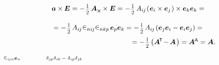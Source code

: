\begin{otherlanguage}{russian}
\nopagebreak\vspace{-0.1em}\[\begin{array}{c}
\bm{a} \times\hspace{-0.1ex} \UnitDyad = - \hspace{.2ex} \smalldisplaystyleonehalf \hspace{.4ex} \bm{A}_{\Xcompanion} \times \UnitDyad = - \hspace{.2ex} \smalldisplaystyleonehalf \, A_{i\hspace{-0.1ex}j} \hspace{-0.2ex}
\left( \hspace{.08ex} \tikzmark{beginFirstCrossProduct} {\bm{e}_i \times \bm{e}_j} \tikzmark{endFirstCrossProduct} \hspace{.16ex} \right)
\times \bm{e}_k \bm{e}_k = \\[1.5em]
%
= - \hspace{.2ex} \smalldisplaystyleonehalf \hspace{.32ex} A_{i\hspace{-0.1ex}j} \hspace{.12ex}
\tikzmark{beginTwoLeviCivitas} \levicivita_{ni\hspace{-0.1ex}j} \levicivita_{nkp} \tikzmark{endTwoLeviCivitas}
\hspace{.32ex} \bm{e}_p \bm{e}_k = - \hspace{.2ex} \smalldisplaystyleonehalf \hspace{.32ex} A_{i\hspace{-0.1ex}j} \hspace{-0.1ex} \left( \bm{e}_j \bm{e}_i - \bm{e}_i \bm{e}_j \right) = \\[.8em]
%
\hspace{13.2em}= - \hspace{.2ex} \smalldisplaystyleonehalf \left({ \bm{A}^{\hspace{-0.1em}\T} \hspace{-0.25ex} - \hspace{-0.2ex} \bm{A} \hspace{.2ex}}\right) = \bm{A}^{\mathsf{\hspace{-0.1ex}A}} = \bm{A}.
\end{array}\]
%
{${\scriptstyle \levicivita_{i\hspace{-0.1ex}jn} \bm{e}_n}$}
%
{${\scriptstyle \hspace{3.2em}\delta_{j\hspace{-0.1ex}p} \delta_{ik} \,-\; \delta_{ip} \delta_{j\hspace{-0.1ex}k}}$}


\end{otherlanguage}
